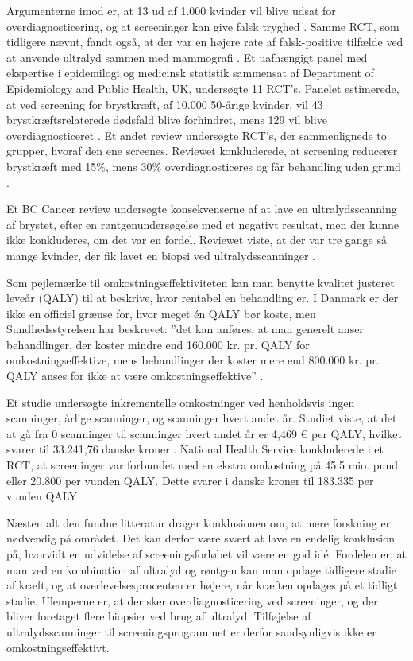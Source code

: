 Argumenterne imod er, at 13 ud af 1.000 kvinder vil blive udsat for overdiagnosticering, og at screeninger kan give falsk tryghed \cite{Argumenter}. Samme RCT, som tidligere nævnt, fandt også, at der var en højere rate af falsk-positive tilfælde ved at anvende ultralyd sammen med mammografi \cite{Japan}. Et uafhængigt panel med ekspertise i epidemilogi og medicinsk statistik sammensat af Department of Epidemiology and Public Health, UK, undersøgte 11 RCT’s. Panelet estimerede, at ved screening for brystkræft, af 10.000 50-årige kvinder, vil 43 brystkræftsrelaterede dødsfald blive forhindret, mens 129 vil blive overdiagnosticeret \cite{Panel}. Et andet review undersøgte RCT’s, der sammenlignede to grupper, hvoraf den ene screenes. Reviewet konkluderede, at screening reducerer brystkræft med 15\%, mens 30\% overdiagnosticeres og får behandling uden grund \cite{Gotzche}. 

Et BC Cancer review undersøgte konsekvenserne af at lave en ultralydsscanning af brystet, efter en røntgenundersøgelse med et negativt resultat, men der kunne ikke konkluderes, om det var en fordel. Reviewet viste, at der var tre gange så mange kvinder, der fik lavet en biopsi ved ultralydsscanninger \cite{DenseBreast}.

Som pejlemærke til omkostningseffektiviteten kan man benytte kvalitet justeret leveår (QALY) til at beskrive, hvor rentabel en behandling er. I Danmark er der ikke en officiel grænse for, hvor meget én QALY bør koste, men Sundhedsstyrelsen har beskrevet: ”det kan anføres, at man generelt anser behandlinger, der koster mindre end 160.000 kr. pr. QALY for omkostningseffektive, mens behandlinger der koster mere end 800.000 kr. pr. QALY anses for ikke at være omkostningseffektive” \cite{QALY}. 

Et studie undersøgte inkrementelle omkostninger ved henholdsvis ingen scanninger, årlige scanninger, og scanninger hvert andet år. Studiet viste, at det at gå fra 0 scanninger til scanninger hvert andet år er 4,469 € per QALY, hvilket svarer til 33.241,76 danske kroner \cite{SpanskStudie}. National Health Service konkluderede i et RCT, at screeninger var forbundet med en ekstra omkostning på 45.5 mio. pund eller 20.800 per vunden QALY. Dette svarer i danske kroner til 183.335 per vunden QALY \cite{ CostEffectiveness}  

Næsten alt den fundne litteratur drager konklusionen om, at mere forskning er nødvendig på området. Det kan derfor være svært at lave en endelig konklusion på, hvorvidt en udvidelse af screeningsforløbet vil være en god idé. Fordelen er, at man ved en kombination af ultralyd og røntgen kan man opdage tidligere stadie af kræft, og at overlevelsesprocenten er højere, når kræften opdages på et tidligt stadie. Ulemperne er, at der sker overdiagnosticering ved screeninger, og der bliver foretaget flere biopsier ved brug af ultralyd. Tilføjelse af ultralydsscanninger til screeningsprogrammet er derfor sandsynligvis ikke er omkostningseffektivt.
